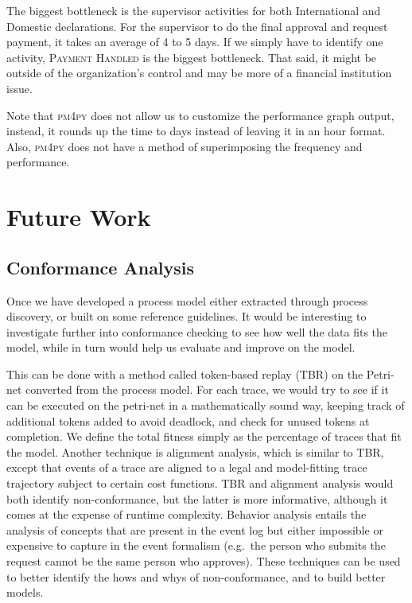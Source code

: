 \documentclass[conference]{IEEEtran}
\begin{document}
The biggest bottleneck is the supervisor activities for both International
and Domestic declarations. For the supervisor to do the final approval and
request payment, it takes an average of 4 to 5 days.
If we simply have to identify one activity, \textsc{Payment Handled}
is the biggest bottleneck. That said,
it might be outside of the organization’s control and may be more of a
financial institution issue.

Note that \textsc{pm4py} does not allow us to customize the performance
graph output,
instead, it rounds up the time to days instead of leaving it in an hour format. Also, \textsc{pm4py} does not have a method of superimposing the frequency and performance.


\section{Future Work}
\label{section-future}

\subsection{Conformance Analysis}

Once we have developed a process model either extracted through process
discovery, or built on some reference guidelines. It would be
interesting to investigate further into conformance checking to see how
well the data fits the model, while in turn would help us evaluate and
improve on the model.

This can be done with a method called token-based replay (TBR) on the
Petri-net converted from the process model. For each trace, we would try
to see if it can be executed on the petri-net in a mathematically sound
way, keeping track of additional tokens added to avoid deadlock, and
check for unused tokens at completion. We define the total fitness
simply as the percentage of traces that fit the model. Another technique
is alignment analysis, which is similar to TBR, except that events of a
trace are aligned to a legal and model-fitting trace trajectory subject
to certain cost functions. TBR and alignment analysis would both
identify non-conformance, but the latter is more informative, although
it comes at the expense of runtime complexity. Behavior analysis entails
the analysis of concepts that are present in the event log but either
impossible or expensive to capture in the event formalism (e.g.~the
person who submits the request cannot be the same person who approves).
These techniques can be used to better identify the hows and whys of
non-conformance, and to build better models.
\end{document}
